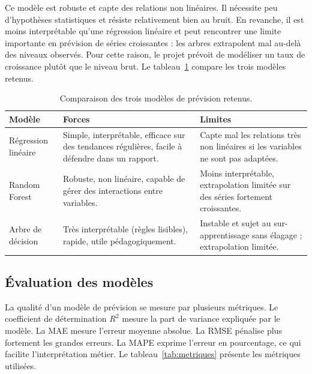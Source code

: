 \par Ce modèle est robuste et capte des relations non linéaires. Il nécessite
peu d'hypothèses statistiques et résiste relativement bien au bruit. En revanche,
il est moins interprétable qu'une régression linéaire et peut rencontrer une
limite importante en prévision de séries croissantes : les arbres extrapolent
mal au-delà des niveaux observés. Pour cette raison, le projet prévoit de
modéliser un taux de croissance plutôt que le niveau brut. Le
tableau~\ref{tab:modelesml} compare les trois modèles retenus.

\begin{table}[H]
\centering
\caption[Comparaison des modèles de prévision]{Comparaison des trois modèles de prévision retenus.}
\label{tab:modelesml}
\begin{tabularx}{\linewidth}{|p{3.2cm}|X|X|}
\hline
\textbf{Modèle} & \textbf{Forces} & \textbf{Limites} \\ \hline
Régression linéaire & Simple, interprétable, efficace sur des tendances régulières, facile à défendre dans un rapport. & Capte mal les relations très non linéaires si les variables ne sont pas adaptées. \\ \hline
Random Forest & Robuste, non linéaire, capable de gérer des interactions entre variables. & Moins interprétable, extrapolation limitée sur des séries fortement croissantes. \\ \hline
Arbre de décision & Très interprétable (règles lisibles), rapide, utile pédagogiquement. & Instable et sujet au sur-apprentissage sans élagage ; extrapolation limitée. \\ \hline
\end{tabularx}
\end{table}

\subsection{Évaluation des modèles}
\par La qualité d'un modèle de prévision se mesure par plusieurs métriques. Le
coefficient de détermination $R^2$ mesure la part de variance expliquée par le
modèle. La \ac{MAE} mesure l'erreur moyenne absolue. La \ac{RMSE} pénalise plus
fortement les grandes erreurs. La \ac{MAPE} exprime l'erreur en pourcentage, ce
qui facilite l'interprétation métier. Le tableau~\ref{tab:metriques} présente
les métriques utilisées.

